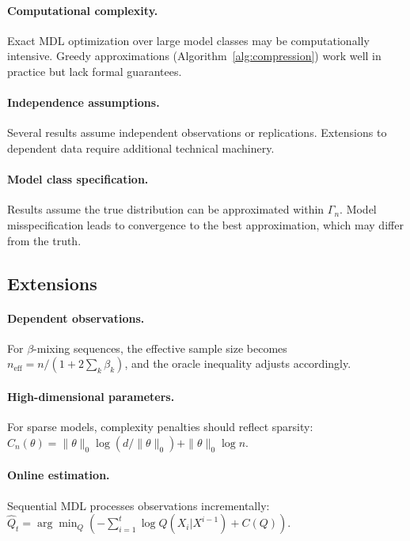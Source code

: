 \documentclass[preprint,review,12pt]{article}
\begin{document}
\paragraph{Computational complexity.}
Exact MDL optimization over large model classes may be computationally 
intensive. Greedy approximations (Algorithm~\ref{alg:compression}) work 
well in practice but lack formal guarantees.

\paragraph{Independence assumptions.}
Several results assume independent observations or replications. Extensions 
to dependent data require additional technical machinery.

\paragraph{Model class specification.}
Results assume the true distribution can be approximated within $\Gamma_n$. 
Model misspecification leads to convergence to the best approximation, which 
may differ from the truth.

\subsection{Extensions}

\paragraph{Dependent observations.}
For $\beta$-mixing sequences, the effective sample size becomes 
$n_{\text{eff}} = n / (1 + 2\sum_k \beta_k)$, and the oracle inequality 
adjusts accordingly.

\paragraph{High-dimensional parameters.}
For sparse models, complexity penalties should reflect sparsity:
$C_n(\theta) = \|\theta\|_0 \log(d/\|\theta\|_0) + \|\theta\|_0 \log n$.

\paragraph{Online estimation.}
Sequential MDL processes observations incrementally:
$\hat{Q}_t = \arg\min_Q (-\sum_{i=1}^t \log Q(X_i | X^{i-1}) + C(Q))$.
\end{document}
